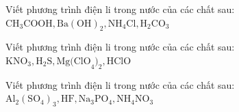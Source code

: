 \begin{bt}
	Viết phương trình điện li trong nước của các chất sau: $\mathrm{CH}_3\mathrm{COOH}, \mathrm{Ba(OH)}_2, \mathrm{NH}_4\mathrm{Cl}, \mathrm{H}_2\mathrm{CO}_3$
\end{bt}

\begin{bt}
	Viết phương trình điện li trong nước của các chất sau: $\mathrm{KNO}_3, \mathrm{H}_2\mathrm{S}, \mathrm{Mg(ClO}_4)_2, \mathrm{HClO}$
\end{bt}

\begin{bt}
	Viết phương trình điện li trong nước của các chất sau: $\mathrm{Al}_2(\mathrm{SO}_4)_3, \mathrm{HF}, \mathrm{Na}_3\mathrm{PO}_4, \mathrm{NH}_4\mathrm{NO}_3$
\end{bt}

